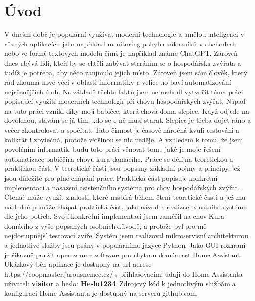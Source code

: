 \chapter{Úvod}
V dnešní době je populární využívat moderní technologie a umělou inteligenci v různých aplikacích jako například monitoring pohybu zákazníků v obchodech nebo ve formě textových modelů čímž je například známe ChatGPT. Zároveň dnes ubývá lidí, kteří by se chtěli zabývat staráním se o hospodářská zvýřata a tudíž je potřeba, aby něco zaujmulo jejich místo. Zároveň jsem sám člověk, který rád zkoumá nové věci v oblasti informatiky a velice ho baví automatizování nejrůznějších úloh. Na základě těchto faktů jsem se rozhodl vytvořit téma práci popisující využití moderních technologií při chovu hospodářských zvýřat. Nápad na tuto práci vznikl díky mojí babičce, která chová doma slepice. Když odjede na dovolenou, stávám se já tím, kdo se o ně musí starat. Slepice je třeba dojet ráno a večer zkontrolovat a spočítat. Tato činnost je časově náročná kvůli cestování a kolikrát i zbytečná, protože většinou se nic neděje. A vzhledem k tomu, že jsem povoláním informatik, budu toto práci věnovat tomu jaké je moje řešení automatizace babiččina chovu kura domácího.
\newline
Práce se dělí na teoretickou a praktickou část. V teoretické části jsou popsány základní pojmy a principy, jež jsou důležité pro plné chápání práce. Praktická část popisuje konkrétní implementaci a nasazení asistenčního systému pro chov hospodářských zvýřat. Čtenář může využít znalosti, které nasbírá během čtení teoretické části a jež mu následně pomůže chápat praktická část, jako návod k realizaci vlastního systému dle jeho potřeb.
\newline
Svojí konkrétní implementaci jsem zaměřil na chov Kura domácího z výše popsaných osobních důvodů, a protože byl pro mě nejdostupnější testovací zvíře. Systém jsem realizoval mikroservisní architekturou a jednotlivé služby jsou psány v populárnímu jazyce Python. Jako GUI rozhraní je šikovně použit open source software pro chytrou domácnost Home Assistant.
\newline
Ukázkový běh aplikace je dostupný na url adrese https://coopmaster.jarousnemec.cz/ s přihlašovacími údaji do Home Assistanta uživatel: \textbf{visitor} a heslo: \textbf{Heslo1234}. Zdrojový kód k jednotlivým službám a konfiguraci Home Assistanta je dostupný na serveru github.com.
